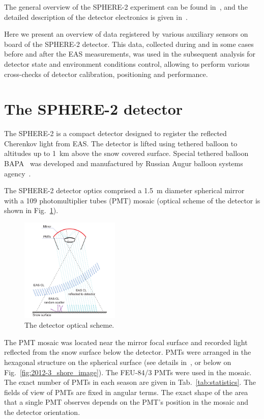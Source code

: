 \documentclass[final,5p,times,twocolumn]{elsarticle}
\begin{document}
The general overview of the SPHERE-2 experiment can be found in~\cite{Ant15a}, and the detailed description of the detector electronics is given in~\cite{Ant20}. 

Here we present an overview of data registered by various auxiliary sensors on board of the SPHERE-2 detector. This data, collected during and in some cases before and after the EAS measurements, was used in the subsequent analysis for detector state and environment conditions control, allowing to perform various cross-checks of detector calibration, positioning and performance.



\section{The SPHERE-2 detector \label{sect:detector}}


The \mbox{SPHERE-2} is a compact detector designed to register the reflected Cherenkov light from EAS. The detector is lifted using tethered balloon to altitudes up to 1~km above the snow covered surface. Special tethered balloon BAPA~\cite{Ant20} was developed and manufactured by Russian Augur balloon systems agency~\cite{Augur}.

The \mbox{SPHERE-2} detector optics comprised a 1.5~m diameter spherical mirror with a 109 photomultiplier tubes (PMT) mosaic (optical scheme of the detector is shown in Fig.~\ref{fig:optics}).

\begin{figure}[bt]
\centering
    \includegraphics[width=0.42\textwidth]{optics}
    \caption{The detector optical scheme.}
\label{fig:optics}
\end{figure}

The PMT mosaic was located near the mirror focal surface and recorded light reflected from the snow surface below the detector. PMTs were arranged in the hexagonal structure on the spherical surface (see details in~\cite{Ant20}, or below on Fig.~\ref{fig:2012-3_shore_image}). The FEU-84/3 PMTs were used in the mosaic. The exact number of PMTs in each season are given in Tab.~\ref{tab:statistics}. The fields of view of PMTs are fixed in angular terms. The exact shape of the area that a single PMT observes depends on the PMT's position in the mosaic and the detector orientation.
\end{document}
